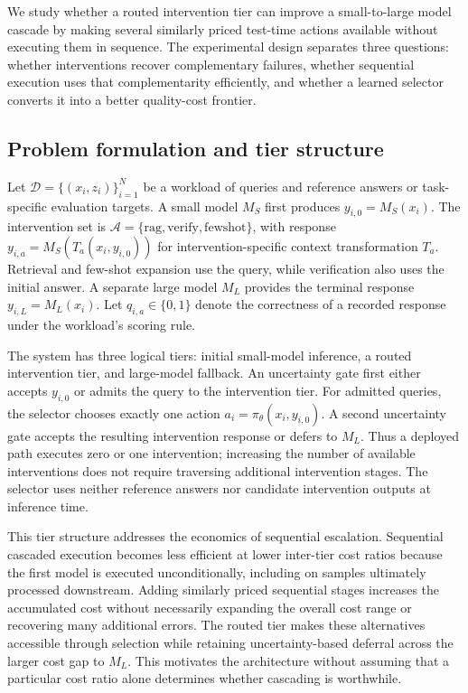 \documentclass[sigconf]{acmart}
\begin{document}
We study whether a routed intervention tier can improve a small-to-large model cascade by making several similarly priced test-time actions available without executing them in sequence. The experimental design separates three questions: whether interventions recover complementary failures, whether sequential execution uses that complementarity efficiently, and whether a learned selector converts it into a better quality-cost frontier. 
\subsection{Problem formulation and tier structure}

Let $\mathcal{D}=\{(x_i,z_i)\}_{i=1}^{N}$ be a workload of queries and reference answers or task-specific evaluation targets. A small model $M_S$ first produces $y_{i,0}=M_S(x_i)$. The intervention set is $\mathcal{A}=\{\mathrm{rag},\mathrm{verify},\mathrm{fewshot}\}$, with response $y_{i,a}=M_S(T_a(x_i,y_{i,0}))$ for intervention-specific context transformation $T_a$. Retrieval and few-shot expansion use the query, while verification also uses the initial answer. A separate large model $M_L$ provides the terminal response $y_{i,L}=M_L(x_i)$. Let $q_{i,a}\in\{0,1\}$ denote the correctness of a recorded response under the workload's scoring rule.

The system has three logical tiers: initial small-model inference, a routed intervention tier, and large-model fallback. An uncertainty gate first either accepts $y_{i,0}$ or admits the query to the intervention tier. For admitted queries, the selector chooses exactly one action $a_i=\pi_\theta(x_i,y_{i,0})$. A second uncertainty gate accepts the resulting intervention response or defers to $M_L$. Thus a deployed path executes zero or one intervention; increasing the number of available interventions does not require traversing additional intervention stages. The selector uses neither reference answers nor candidate intervention outputs at inference time.

This tier structure addresses the economics of sequential escalation. Sequential cascaded execution becomes less efficient at lower inter-tier cost ratios because the first model is executed unconditionally, including on samples ultimately processed downstream. Adding similarly priced sequential stages increases the accumulated cost without necessarily expanding the overall cost range or recovering many additional errors. The routed tier makes these alternatives accessible through selection while retaining uncertainty-based deferral across the larger cost gap to $M_L$. This motivates the architecture without assuming that a particular cost ratio alone determines whether cascading is worthwhile.
\end{document}
